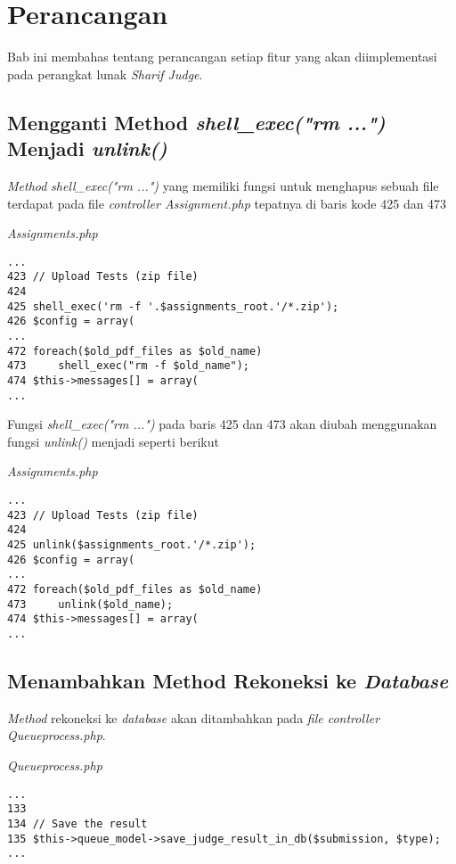 \chapter{Perancangan}
\label{chap:perancangan}

Bab ini membahas tentang perancangan setiap fitur yang akan diimplementasi pada perangkat lunak \textit{Sharif Judge}. 

\section{Mengganti Method \textit{shell\_exec("rm ...")} Menjadi \textit{unlink()}}
\textit{Method} \textit{shell\_exec("rm ...")} yang memiliki fungsi untuk menghapus sebuah file terdapat pada file \textit{controller Assignment.php} tepatnya di baris kode 425 dan 473

\textit{Assignments.php}
\begin{lstlisting}[basicstyle=\ttfamily, frame=single,
columns=fullflexible, keepspaces=true]
...
423	// Upload Tests (zip file)
424	
425	shell_exec('rm -f '.$assignments_root.'/*.zip');
426	$config = array(
...
472	foreach($old_pdf_files as $old_name)
473		shell_exec("rm -f $old_name");
474	$this->messages[] = array(
...
\end{lstlisting}

Fungsi \textit{shell\_exec("rm ...")} pada baris 425 dan 473 akan diubah menggunakan fungsi \textit{unlink()} menjadi seperti berikut

\textit{Assignments.php}
\begin{lstlisting}[basicstyle=\ttfamily, frame=single,
columns=fullflexible, keepspaces=true]
...
423	// Upload Tests (zip file)
424	
425	unlink($assignments_root.'/*.zip');
426	$config = array(
...
472	foreach($old_pdf_files as $old_name)
473		unlink($old_name);
474	$this->messages[] = array(
...
\end{lstlisting}

\section{Menambahkan Method Rekoneksi ke \textit{Database}}
\textit{Method} rekoneksi ke \textit{database} akan ditambahkan pada \textit{file controller Queueprocess.php}. 

\textit{Queueprocess.php}
\begin{lstlisting}[basicstyle=\ttfamily, frame=single,
columns=fullflexible, keepspaces=true]
...
133
134	// Save the result
135	$this->queue_model->save_judge_result_in_db($submission, $type);
...
\end{lstlisting}

